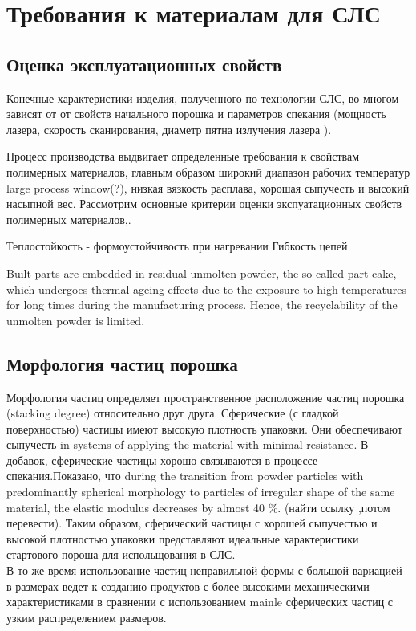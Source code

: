 \section{Требования к материалам для СЛС}

\subsection{Оценка эксплуатационных свойств}
Конечные характеристики изделия, полученного по технологии СЛС, во многом зависят от от свойств начального порошка  и параметров спекания (мощность лазера, скорость сканирования, диаметр пятна излучения лазера ).

Процесс производства выдвигает определенные требования к свойствам полимерных материалов, главным образом широкий диапазон рабочих температур large process window(?), низкая вязкость расплава, хорошая сыпучесть и высокий насыпной вес.
Рассмотрим основные критерии оценки экспуатационных свойств полимерных материалов,\cite{termopols}.



Теплостойкость - формоустойчивость при нагревании
Гибкость цепей

Built parts are embedded in residual unmolten powder, the so-called part cake, which undergoes
thermal ageing effects due to the exposure to high temperatures for long times during the manufacturing process. Hence, the
recyclability of the unmolten powder is limited. \cite{ageing}


\subsection{Морфология частиц порошка}
Морфология частиц определяет пространственное расположение частиц порошка (stacking degree) относительно друг друга. Сферические (с гладкой поверхностью) частицы имеют высокую плотность упаковки. Они обеспечивают  сыпучесть in systems of applying the material with minimal resistance. В добавок, сферические частицы хорошо связываются в процессе спекания.Показано, что 
during the transition from powder particles with predominantly spherical morphology to particles of irregular shape of the same material, the elastic modulus decreases by almost 40 \%. 
(найти ссылку ,потом перевести).
Таким образом, сферический частицы с хорошей сыпучестью и высокой плотностью упаковки представляют идеальные характеристики стартового пороша для испольщования в СЛС.\\
В то же время использование частиц неправильной формы с большой вариацией в размерах ведет к созданию продуктов с более высокими механическими характеристиками в сравнении с использованием mainle сферических частиц с узким распределением размеров.

